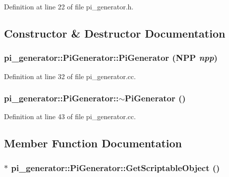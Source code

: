 Definition at line 22 of file pi\_\-generator.h.



\subsection{Constructor \& Destructor Documentation}
\hypertarget{classpi__generator_1_1_pi_generator_a0f5a55bbb942dee1b185447f0a7e24be}{
\subsubsection[{PiGenerator}]{\setlength{\rightskip}{0pt plus 5cm}pi\_\-generator::PiGenerator::PiGenerator ({\bf NPP} {\em npp})}}
\label{classpi__generator_1_1_pi_generator_a0f5a55bbb942dee1b185447f0a7e24be}


Definition at line 32 of file pi\_\-generator.cc.

\hypertarget{classpi__generator_1_1_pi_generator_ac7d9c07492fd86678b8f66643e1e8c1e}{
\subsubsection[{$\sim$PiGenerator}]{\setlength{\rightskip}{0pt plus 5cm}pi\_\-generator::PiGenerator::$\sim$PiGenerator ()}}
\label{classpi__generator_1_1_pi_generator_ac7d9c07492fd86678b8f66643e1e8c1e}


Definition at line 43 of file pi\_\-generator.cc.



\subsection{Member Function Documentation}
\hypertarget{classpi__generator_1_1_pi_generator_ac65f31616ae3d223bdc01b91aea91762}{
\subsubsection[{GetScriptableObject}]{ $\ast$ pi\_\-generator::PiGenerator::GetScriptableObject ()}}
\label{classpi__generator_1_1_pi_generator_ac65f31616ae3d223bdc01b91aea91762}


